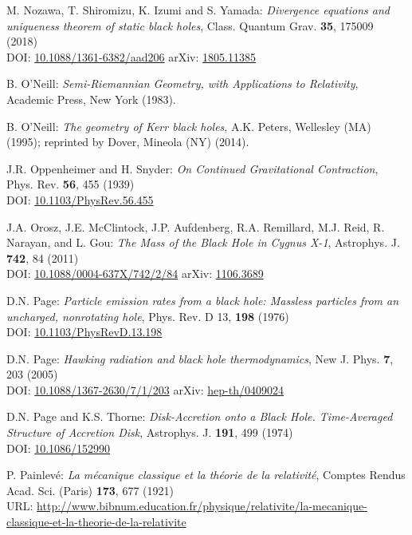 \begin{thebibliography}{123}
M. Nozawa, T. Shiromizu, K. Izumi and S. Yamada:
{\em Divergence equations and uniqueness theorem of static black holes},
Class. Quantum Grav. {\bf 35}, 175009 (2018)\\
DOI: \href{https://doi.org/10.1088/1361-6382/aad206}{10.1088/1361-6382/aad206}\hfill
arXiv: \href{https://arxiv.org/abs/1805.11385}{1805.11385}

B. O'Neill: {\em Semi-Riemannian Geometry, with Applications to Relativity},
Academic Press, New York (1983).

B. O'Neill: {\em The geometry of Kerr black holes}, A.K. Peters, Wellesley (MA) (1995);
reprinted by Dover, Mineola (NY) (2014).

J.R. Oppenheimer and H. Snyder:
{\em On Continued Gravitational Contraction},
Phys. Rev. {\bf 56}, 455 (1939)\\
DOI: \href{https://doi.org/10.1103/PhysRev.56.455}{10.1103/PhysRev.56.455}

J.A. Orosz, J.E. McClintock, J.P. Aufdenberg, R.A. Remillard, M.J. Reid, R. Narayan, and L. Gou:
{\em The Mass of the Black Hole in Cygnus X-1},
Astrophys. J. {\bf 742}, 84 (2011)\\
DOI: \href{https://doi.org/10.1088/0004-637X/742/2/84}{10.1088/0004-637X/742/2/84}\hfill
arXiv: \href{https://arxiv.org/abs/1106.3689}{1106.3689}

D.N. Page:
{\em Particle emission rates from a black hole: Massless particles from an uncharged, nonrotating hole},
Phys. Rev. D 13, {\bf 198} (1976)\\
DOI: \href{https://doi.org/10.1103/PhysRevD.13.198}{10.1103/PhysRevD.13.198}

D.N. Page:
{\em Hawking radiation and black hole thermodynamics},
New J. Phys. {\bf 7}, 203 (2005)\\
DOI: \href{https://doi.org/10.1088/1367-2630/7/1/203}{10.1088/1367-2630/7/1/203}\hfill
arXiv: \href{https://arxiv.org/abs/hep-th/0409024}{hep-th/0409024}

D.N. Page and K.S. Thorne:
{\em Disk-Accretion onto a Black Hole. Time-Averaged Structure of Accretion Disk},
Astrophys. J. {\bf 191}, 499 (1974)\\
DOI: \href{https://doi.org/10.1086/152990}{10.1086/152990}

P. Painlevé: \emph{La mécanique classique et la théorie de la relativité},
Comptes Rendus Acad. Sci. (Paris) {\bf 173}, 677 (1921)\\
URL: \url{http://www.bibnum.education.fr/physique/relativite/la-mecanique-classique-et-la-theorie-de-la-relativite}


\end{thebibliography}
